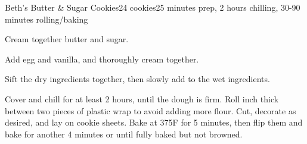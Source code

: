 \documentclass[../Cookbook.tex]{subfiles}
\begin{document}
\begin{recipe}{Beth's Butter \& Sugar Cookies}{24 cookies}{25 minutes prep, 2 hours chilling, 30-90 minutes rolling/baking}

	Cream together butter and sugar.

	Add egg and vanilla, and thoroughly cream together.

	Sift the dry ingredients together, then slowly add to the wet ingredients.

	\newstep
	Cover and chill for at least 2 hours, until the dough is firm. Roll  inch thick between two pieces of plastic wrap to avoid adding more flour. Cut, decorate as desired, and lay on cookie sheets. Bake at 375\0F for
	5 minutes, then flip them and bake for another 4 minutes %
	or until fully baked but not browned.

\end{recipe}
\end{document}
